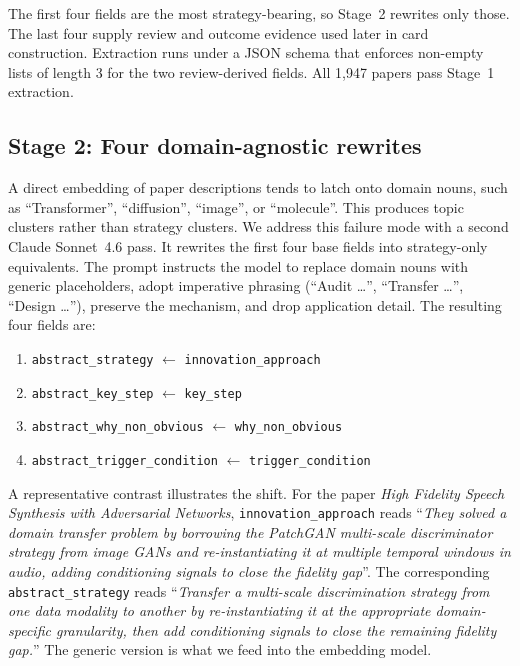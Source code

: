 \documentclass[10pt,a4paper]{article}
\begin{document}
The first four fields are the most strategy-bearing, so Stage~2 rewrites only those. The last four supply review and outcome evidence used later in card construction. Extraction runs under a JSON schema that enforces non-empty lists of length 3 for the two review-derived fields. All 1{,}947 papers pass Stage~1 extraction.

\subsection{Stage 2: Four domain-agnostic rewrites}

A direct embedding of paper descriptions tends to latch onto domain nouns, such as ``Transformer'', ``diffusion'', ``image'', or ``molecule''. This produces topic clusters rather than strategy clusters. We address this failure mode with a second Claude Sonnet~4.6 pass. It rewrites the first four base fields into strategy-only equivalents. The prompt instructs the model to replace domain nouns with generic placeholders, adopt imperative phrasing (``Audit \ldots'', ``Transfer \ldots'', ``Design \ldots''), preserve the mechanism, and drop application detail. The resulting four fields are:

\begin{enumerate}[nosep, leftmargin=1.5em]
\item \texttt{abstract\_strategy} $\leftarrow$ \texttt{innovation\_approach}
\item \texttt{abstract\_key\_step} $\leftarrow$ \texttt{key\_step}
\item \texttt{abstract\_why\_non\_obvious} $\leftarrow$ \texttt{why\_non\_obvious}
\item \texttt{abstract\_trigger\_condition} $\leftarrow$ \texttt{trigger\_condition}
\end{enumerate}

A representative contrast illustrates the shift. For the paper \emph{High Fidelity Speech Synthesis with Adversarial Networks}, \texttt{innovation\_approach} reads ``\textit{They solved a domain transfer problem by borrowing the PatchGAN multi-scale discriminator strategy from image GANs and re-instantiating it at multiple temporal windows in audio, adding conditioning signals to close the fidelity gap}''. The corresponding \texttt{abstract\_strategy} reads ``\textit{Transfer a multi-scale discrimination strategy from one data modality to another by re-instantiating it at the appropriate domain-specific granularity, then add conditioning signals to close the remaining fidelity gap.}'' The generic version is what we feed into the embedding model.
\end{document}
